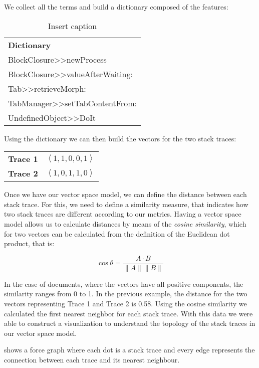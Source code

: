 We collect all the terms and build a dictionary composed of the features:

\begin{table}[h]
{\footnotesize
\begin{centering}
\caption{Insert caption}
\begin{tabular}{l}
\textbf{Dictionary} \\
BlockClosure{>}{>}newProcess \\
BlockClosure{>}{>}valueAfterWaiting: \\
Tab{>}{>}retrieveMorph: \\
TabManager{>}{>}setTabContentFrom: \\
UndefinedObject{>}{>}DoIt
\end{tabular}
\end{centering}}
\end{table}

Using the dictionary we can then build the vectors for the two stack traces:

\begin{center}
\begin{tabular}{p{2cm}r}
\textbf{Trace 1} & $\left<1,1,0,0,1\right>$ \\
\textbf{Trace 2} & $\left<1,0,1,1,0\right>$
\end{tabular}
\end{center}

Once we have our vector space model, we can define the distance between each stack trace. For this, we need to define a similarity measure, that indicates how two stack traces are different according to our metrics. Having a vector space model allows us to calculate distances by means of the \emph{cosine similarity}, which for two vectors can be calculated from the definition of the Euclidean dot product, that is:

\begin{displaymath} \cos\theta=\frac{A \cdot B}{\|A\|\|B\|} \end{displaymath}

In the case of documents, where the vectors have all positive components, the similarity ranges from 0 to 1. In the previous example, the distance for the two vectors representing Trace 1 and Trace 2 is 0.58. Using the cosine similarity we calculated the first nearest neighbor for each stack trace. With this data we were able to construct a visualization to understand the topology of the stack traces in our vector space model. 

 shows a force graph where each dot is a stack trace and every edge represents the connection between each trace and its nearest neighbour.

